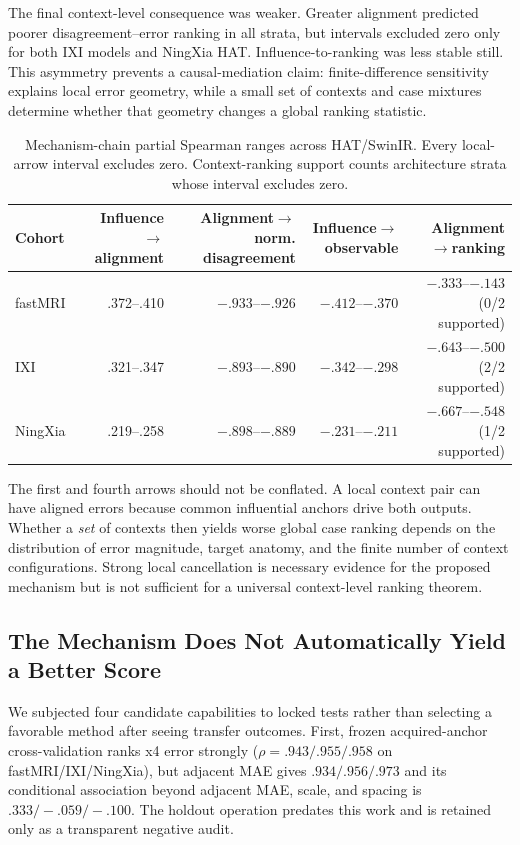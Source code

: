 \documentclass[10pt,twocolumn,letterpaper]{article}
\begin{document}
The final context-level consequence was weaker. Greater alignment predicted poorer disagreement--error ranking in all strata, but intervals excluded zero only for both IXI models and NingXia HAT. Influence-to-ranking was less stable still. This asymmetry prevents a causal-mediation claim: finite-difference sensitivity explains local error geometry, while a small set of contexts and case mixtures determine whether that geometry changes a global ranking statistic.

\begin{table}[t]
\centering
\caption{Mechanism-chain partial Spearman ranges across HAT/SwinIR. Every local-arrow interval excludes zero. Context-ranking support counts architecture strata whose interval excludes zero.}
\label{tab:chain}
\scriptsize
\setlength{\tabcolsep}{3.2pt}
\begin{tabular}{lrrrr}
\toprule
Cohort&Influence$\rightarrow$alignment&Alignment$\rightarrow$norm. disagreement&Influence$\rightarrow$observable&Alignment$\rightarrow$ranking\\
\midrule
fastMRI&.372--.410&$-.933$--$-.926$&$-.412$--$-.370$&$-.333$--$-.143$ (0/2 supported)\\
IXI&.321--.347&$-.893$--$-.890$&$-.342$--$-.298$&$-.643$--$-.500$ (2/2 supported)\\
NingXia&.219--.258&$-.898$--$-.889$&$-.231$--$-.211$&$-.667$--$-.548$ (1/2 supported)\\
\bottomrule
\end{tabular}
\end{table}

The first and fourth arrows should not be conflated. A local context pair can have aligned errors because common influential anchors drive both outputs. Whether a \emph{set} of contexts then yields worse global case ranking depends on the distribution of error magnitude, target anatomy, and the finite number of context configurations. Strong local cancellation is necessary evidence for the proposed mechanism but is not sufficient for a universal context-level ranking theorem.

\subsection{The Mechanism Does Not Automatically Yield a Better Score}
We subjected four candidate capabilities to locked tests rather than selecting a favorable method after seeing transfer outcomes. First, frozen acquired-anchor cross-validation ranks x4 error strongly ($\rho=.943/.955/.958$ on fastMRI/IXI/NingXia), but adjacent MAE gives $.934/.956/.973$ and its conditional association beyond adjacent MAE, scale, and spacing is $.333/-.059/-.100$. The holdout operation predates this work and is retained only as a transparent negative audit.
\end{document}
